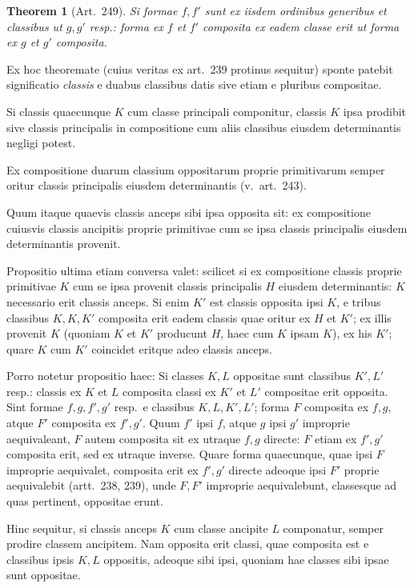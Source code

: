 \documentclass[12pt,a4paper]{article}
\theoremstyle{plain}
\newtheorem{theorem}{Theorem}[section]
\theoremstyle{definition}
\theoremstyle{remark}
\theoremstyle{problemstyle}
\begin{document}
\begin{theorem}[Art.\ 249]
Si formae $f, f'$ sunt ex iisdem ordinibus generibus et classibus ut $g, g'$ resp.: forma ex $f$ et $f'$ composita ex eadem classe erit ut forma ex $g$ et $g'$ composita.
\end{theorem}

Ex hoc theoremate (cuius veritas ex art.\ 239 protinus sequitur) sponte patebit significatio \emph{classis} e duabus classibus datis sive etiam e pluribus compositae.

Si classis quaecunque $K$ cum classe principali componitur, classis $K$ ipsa prodibit sive classis principalis in compositione cum aliis classibus eiusdem determinantis negligi potest.

Ex compositione duarum classium oppositarum proprie primitivarum semper oritur classis principalis eiusdem determinantis (v.\ art.\ 243).

Quum itaque quaevis classis anceps sibi ipsa opposita sit: ex compositione cuiusvis classis ancipitis proprie primitivae cum se ipsa classis principalis eiusdem determinantis provenit.

Propositio ultima etiam conversa valet: scilicet si ex compositione classis proprie primitivae $K$ cum se ipsa provenit classis principalis $H$ eiusdem determinantis: $K$ necessario erit classis anceps. Si enim $K'$ est classis opposita ipsi $K$, e tribus classibus $K, K, K'$ composita erit eadem classis quae oritur ex $H$ et $K'$; ex illis provenit $K$ (quoniam $K$ et $K'$ producunt $H$, haec cum $K$ ipsam $K$), ex his $K'$; quare $K$ cum $K'$ coincidet eritque adeo classis anceps.

Porro notetur propositio haec: Si classes $K, L$ oppositae sunt classibus $K', L'$ resp.: classis ex $K$ et $L$ composita classi ex $K'$ et $L'$ compositae erit opposita. Sint formae $f, g, f', g'$ resp.\ e classibus $K, L, K', L'$; forma $F$ composita ex $f, g$, atque $F'$ composita ex $f', g'$. Quum $f'$ ipsi $f$, atque $g$ ipsi $g'$ improprie aequivaleant, $F$ autem composita sit ex utraque $f, g$ directe: $F$ etiam ex $f', g'$ composita erit, sed ex utraque inverse. Quare forma quaecunque, quae ipsi $F$ improprie aequivalet, composita erit ex $f', g'$ directe adeoque ipsi $F'$ proprie aequivalebit (artt.\ 238, 239), unde $F, F'$ improprie aequivalebunt, classesque ad quas pertinent, oppositae erunt.

Hinc sequitur, si classis anceps $K$ cum classe ancipite $L$ componatur, semper prodire classem ancipitem. Nam opposita erit classi, quae composita est e classibus ipsis $K, L$ oppositis, adeoque sibi ipsi, quoniam hae classes sibi ipsae sunt oppositae.
\end{document}
